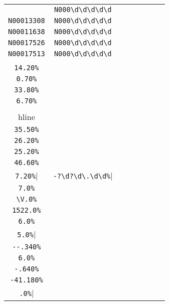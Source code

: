 \begin{longtable}{cccccccc}
\begin{tabular}{ll}
    \verb|N00042411| & \verb|N000\d\d\d\d\d|\\
\verb|N00013308| & \verb|N000\d\d\d\d\d|\\
\verb|N00011638| & \verb|N000\d\d\d\d\d|\\
\verb|N00017526| & \verb|N000\d\d\d\d\d|\\
\verb|N00017513| & \verb|N000\d\d\d\d\d|
\end{tabular}
\\\midrule 
\begin{tabular}{l}
    \verb|-11.50%|\\
\verb|14.20%|\\
\verb|0.70%|\\
\verb|33.80%|\\
\verb|6.70%|\\
\\hline\\
\verb|35.50%|\\
\verb|26.20%|\\
\verb|25.20%|\\
\verb|46.60%|\\
\verb|7.20%|
\end{tabular}

&
\verb|-?\d?\d\.\d\d%|
&

\begin{tabular}{l}
    \verb|(.)*(\d)*\.(\d)*0%|\\
\verb|7.0%|\\
\verb|\V.0%|\\
\verb|1522.0%|\\
\verb|6.0%|\\
\verb|5.0%|
\end{tabular}

&

\begin{tabular}{l}
    \verb|(-)*(\d)*\.(\d)*0%|\\
\verb|--.340%|\\
\verb|6.0%|\\
\verb|-.640%|\\
\verb|-41.180%|\\
\verb|.0%|
\end{tabular}

&


\end{longtable}
